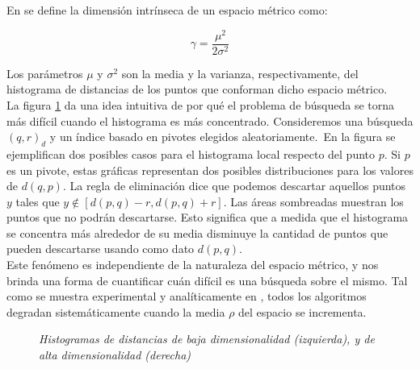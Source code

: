 \noindent En \cite{oursurvey} se define la dimensi\'on intr\'inseca de un espacio m\'etrico como:

\[
\gamma = \frac{\mu^2}{2\sigma^2}
\]

Los par\'ametros $\mu$ y $\sigma^2$ son la media y la varianza, respectivamente, del histograma de distancias de los puntos que conforman dicho espacio m\'etrico.\\

La figura \ref{dim1} da una idea intuitiva de por qu\'e el problema de b\'usqueda se torna m\'as dif\'icil cuando el histograma es m\'as concentrado. Consideremos una b\'usqueda $(q,r)_{d}$ y un \'indice
basado en pivotes elegidos aleatoriamente.\
En la figura se ejemplifican dos posibles casos para el histograma local respecto del punto $p$. Si $p$ es un pivote, estas gr\'aficas representan dos posibles distribuciones para los valores de $d(q,p)$. La regla de eliminaci\'on dice que podemos descartar aquellos puntos $y$ tales que  $y \notin [d(p,q)-r, d(p,q) + r]$. Las \'areas sombreadas muestran  los puntos que no podr\'an descartarse. Esto significa que a medida que el histograma se concentra m\'as alrededor de su media disminuye la cantidad de puntos que pueden descartarse usando como dato $d(p,q)$.\\

Este fen\'omeno es independiente de la naturaleza del espacio m\'etrico,  y nos brinda una forma de cuantificar cu\'an dif\'icil es una b\'usqueda sobre el mismo. Tal como se muestra experimental y anal\'iticamente en \cite{oursurvey}, todos los algoritmos degradan  sistem\'aticamente cuando la media $\rho$ del espacio se incrementa.\\

\begin{figure}[tb]
\centerline{%
  }
  \caption [Histogramas de distancias de baja y
             alta dimensionalidad]
    { \textsl{\footnotesize Histogramas de distancias de baja dimensionalidad
                (izquierda), y  de alta dimensionalidad (derecha)}}
\label{dim1}
\end{figure}

